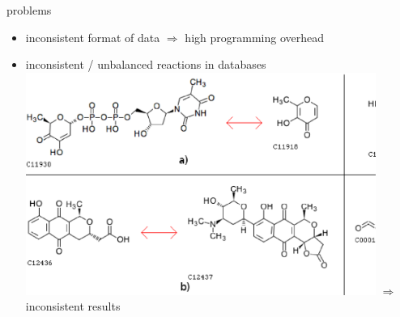 \documentclass[style=aggie]{powerdot}
\begin{document}
\begin{slide}{problems}
\begin{itemize}
  \item inconsistent format of data $\Rightarrow$ high programming overhead\newline
  \item inconsistent / unbalanced reactions in databases\newline \\
  \includegraphics[width=0.9\textwidth]{examples.ps}
  $\Rightarrow$ inconsistent results
\end{itemize}
\end{slide}
\end{document}
